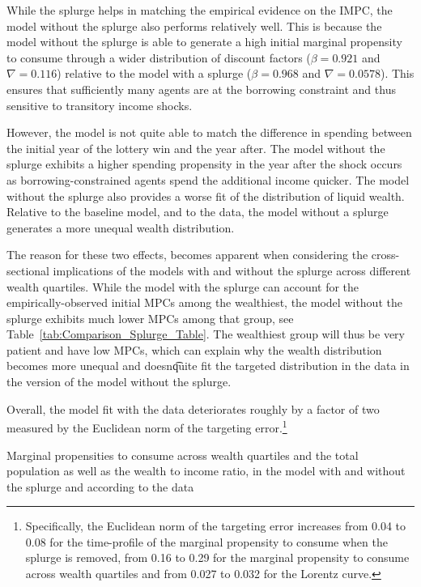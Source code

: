 \documentclass[\econtexRoot/HAFiscal]{subfiles}
\begin{document}
While the splurge helps in matching the empirical evidence on the IMPC, the model without the splurge also performs relatively well.
This is because the model without the splurge is able to generate a high initial marginal propensity to consume through a wider distribution of discount factors ($\beta = 0.921$ and $\nabla=0.116$) relative to the model with a splurge ($\beta = 0.968$ and $\nabla=0.0578$).
This ensures that sufficiently many agents are at the borrowing constraint and thus sensitive to transitory income shocks.

However, the model is not quite able to match the difference in spending between the initial year of the lottery win and the year after.
The model without the splurge exhibits a higher spending propensity in the year after the shock occurs as borrowing-constrained agents spend the additional income quicker.
The model without the splurge also provides a worse fit of the distribution of liquid wealth.
Relative to the baseline model, and to the data, the model without a splurge generates a more unequal wealth distribution.


The reason for these two effects, becomes apparent when considering the cross-sectional implications of the models with and without the splurge across different wealth quartiles.
While the model with the splurge can account for the empirically-observed initial MPCs among the wealthiest, the model without the splurge exhibits much lower MPCs among that group, see Table~\ref{tab:Comparison_Splurge_Table}.
The wealthiest group will thus be very patient and have low MPCs, which can explain why the wealth distribution becomes more unequal and doesn\t quite fit the targeted distribution in the data in the version of the model without the splurge.


Overall, the model fit with the data deteriorates roughly by a factor of two measured by the Euclidean norm of the targeting error.\footnote{Specifically, the Euclidean norm of the targeting error increases from 0.04 to 0.08 for the time-profile of the marginal propensity to consume when the splurge is removed, from 0.16 to 0.29 for the marginal propensity to consume across wealth quartiles and from 0.027 to 0.032 for the Lorentz curve.} 

\begin{table}[t]
	\center
	
	\caption{Marginal propensities to consume across wealth quartiles and the total population as well as the wealth to income ratio, in the model with and without the splurge and according to the data}
	\notinsubfile{\label{tab:Comparison_Splurge_Table}}
\end{table}
\end{document}
